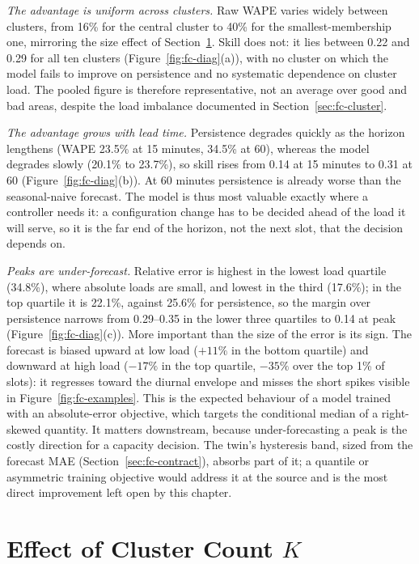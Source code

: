 \emph{The advantage is uniform across clusters.} Raw WAPE varies widely between clusters, from
16\% for the central cluster to 40\% for the smallest-membership one, mirroring the size effect of
Section~\ref{sec:graphsize}. Skill does not: it lies between 0.22 and 0.29 for all ten clusters
(Figure~\ref{fig:fc-diag}(a)), with no cluster on which the model fails to improve on persistence
and no systematic dependence on cluster load. The pooled figure is therefore representative, not an
average over good and bad areas, despite the load imbalance documented in
Section~\ref{sec:fc-cluster}.

\emph{The advantage grows with lead time.} Persistence degrades quickly as the horizon lengthens
(WAPE 23.5\% at 15 minutes, 34.5\% at 60), whereas the model degrades slowly (20.1\% to 23.7\%), so
skill rises from 0.14 at 15 minutes to 0.31 at 60 (Figure~\ref{fig:fc-diag}(b)). At 60 minutes
persistence is already worse than the seasonal-naive forecast. The model is thus most valuable exactly
where a controller needs it: a configuration change has to be decided ahead of the load it will
serve, so it is the far end of the horizon, not the next slot, that the decision depends on.

\emph{Peaks are under-forecast.} Relative error is highest in the lowest load quartile (34.8\%), where
absolute loads are small, and lowest in the third (17.6\%); in the top quartile it is 22.1\%, against
25.6\% for persistence, so the margin over persistence narrows from 0.29--0.35 in the lower three
quartiles to 0.14 at peak (Figure~\ref{fig:fc-diag}(c)). More important than the size of the error is
its sign. The forecast is biased upward at low load ($+11\%$ in the bottom quartile) and downward at
high load ($-17\%$ in the top quartile, $-35\%$ over the top 1\% of slots): it regresses toward the
diurnal envelope and misses the short spikes visible in Figure~\ref{fig:fc-examples}. This is the
expected behaviour of a model trained with an absolute-error objective, which targets the conditional
median of a right-skewed quantity. It matters downstream, because under-forecasting a peak is the
costly direction for a capacity decision. The twin's hysteresis band, sized from the forecast MAE
(Section~\ref{sec:fc-contract}), absorbs part of it; a quantile or asymmetric training objective
would address it at the source and is the most direct improvement left open by this chapter.

\section{Effect of Cluster Count $K$}
\label{sec:graphsize}

